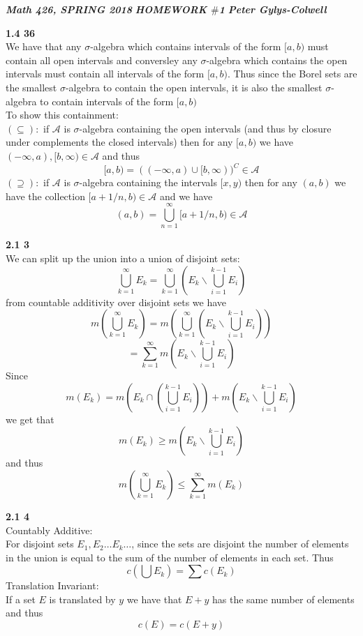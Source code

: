\documentclass[12pt]{article}
\newenvironment{ques}[1]{\textbf{#1}\vspace{1 mm}\\ }{\bigskip}
\theoremstyle{definition}
\renewcommand{\l}{\left }
\renewcommand{\r}{\right }
\renewcommand{\-}{\backslash}
\begin{document}
\noindent \textit{\textbf{Math 426, SPRING 2018}} \hspace{1.3cm}
\textit{\textbf{HOMEWORK $\#$1}} \hspace{1.3cm} \textit{\textbf{Peter
Gylys-Colwell}} 

\vspace{1cm}
\begin{ques}{1.4 36}
	We have that any $\sigma$-algebra which contains intervals of the form
	$[a,b)$ must contain all open intervals and conversley any $\sigma$-algebra
	which contains the open intervals must contain all intervals of the form
	$[a,b)$. Thus since the Borel sets are the smallest $\sigma$-algebra to
	contain the open intervals, it is also the smallest $\sigma$-algebra to
	contain intervals of the form $[a,b)$\\
	To show this containment:\\
	$(\subseteq):$ if $\mathcal A$ is $\sigma$-algebra containing the open
	intervals (and thus by closure under complements the closed intervals) then
	for any $[a,b)$ we have $(-\infty,a), [b,\infty) \in \mathcal A$ and thus
	$$[a,b) = ((-\infty,a) \cup [b,\infty))^C \in \mathcal A$$
	$(\supseteq):$ if $\mathcal A$ is $\sigma$-algebra containing the 
	intervals $[x,y)$ then for any $(a,b)$ we have the collection $[a + 1/n, b) \in
	\mathcal A$ and we have
	$$(a,b) = \bigcup_{n=1}^\infty [a + 1/n, b) \in \mathcal
	A$$
\end{ques}

\begin{ques}{2.1 3}
	We can split up the union into a union of disjoint sets:
	$$\bigcup_{k=1}^\infty E_k = \bigcup_{k=1}^\infty \l(E_k \backslash 
	\bigcup_{i=1}^{k-1}E_i\r)$$
	from countable additivity over disjoint sets we have
	$$m\l(\bigcup_{k=1}^\infty E_k\r) = m\l(\bigcup_{k=1}^\infty \l(E_k \backslash 
	\bigcup_{i=1}^{k-1}E_i\r)\r)$$
	$$= \sum_{k=1}^\infty m\l(E_k \backslash 
	\bigcup_{i=1}^{k-1}E_i\r)$$
	Since 
	$$m(E_k) = m \l(E_k \cap \l( 
	\bigcup_{i=1}^{k-1}E_i\r)\r) + m\l(E_k \backslash 
	\bigcup_{i=1}^{k-1}E_i\r)$$
	we get that
	$$m(E_k) \geq m\l(E_k \backslash \bigcup_{i=1}^{k-1}E_i\r)$$
	and thus
	$$m\l(\bigcup_{k=1}^\infty E_k\r) \leq \sum_{k=1}^\infty m(E_k)$$
\end{ques}

\begin{ques}{2.1 4}
	Countably Additive:\\
	For disjoint sets $E_1, E_2 \dots E_k \dots$, since the sets are disjoint
	the number of elements in the union is equal to the sum of the number of
	elements in each set. Thus
	$$c\l(\bigcup E_k\r) = \sum c(E_k)$$
	Translation Invariant:\\
	If a set $E$ is translated by $y$ we have that $E + y$ has the same number
	of elements and thus
	$$c(E) = c(E + y)$$
\end{ques}
\end{document}
